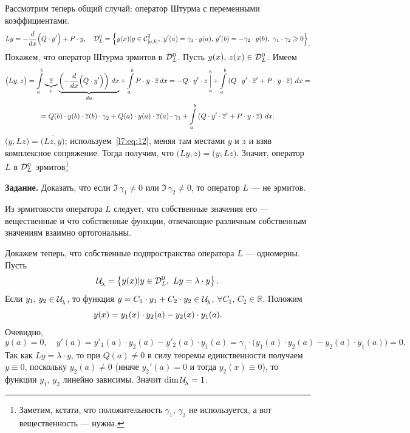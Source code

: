 Рассмотрим теперь общий случай: оператор Штурма с переменными коэффициентами.
\begin{equation*}
	Ly=-\der{}{x}\Big(Q\cdot y'\Big)+P\cdot y,\quad\mc{D}_{L}^{0}=\left\{y(x)|y\in\Cfn[{[a,b]}]{2},\ y'(a)=\gamma_1\cdot y(a),\,y'(b)=-\gamma_2\cdot y(b),\ \gamma_1\cdot\gamma_2\geqslant0\right\}_{\displaystyle.}
\end{equation*}
Покажем, что оператор Штурма эрмитов в $\mathcal{D}_{L}^{0}$. Пусть $y(x),\,z(x)\in\mathcal{D}_{L}^{0}$. Имеем 
\begin{multline}
	\label{l7:eq:12}
	\big(Ly,z\big)=\int\limits_a^b\underbrace{\overline{z}}_{v}\underbrace{\left(-\frac{d}{dx}\Big(Q\cdot y'\Big)\right)\,dx}_{du}+\int\limits_a^b P\cdot y\cdot\overline{z}\,dx=-Q\cdot y'\cdot z\mathop{\Big|}\limits_a^b+\int\limits_a^b\left(Q\cdot y'\cdot\overline{z}'+P\cdot y\cdot\overline{z}\right)\,dx=\\
	=Q(b)\cdot y(b)\cdot\overline{z}(b)\cdot\gamma_2+Q(a)\cdot y(a)\cdot\overline{z}(a)\cdot\gamma_1+\int\limits_a^b\left(Q\cdot y'\cdot\overline{z}'+P\cdot y\cdot\overline{z}\right)\,dx.
\end{multline}
$\big(y,Lz\big)=\overline{\big(Lz,y\big)}$; используем~\eqref{l7:eq:12}, меняя там местами $y$ и $z$ и взяв комплексное сопряжение. Тогда получим, что $\big(Ly,z\big)=\big(y,Lz\big)$. Значит, оператор $L$ в $\mathcal{D}_{L}^{0}$ эрмитов\footnote{Заметим, кстати, что положительность $\gamma_1$, $\gamma_2$ не используется, а вот вещественность --- нужна.}
\vspace{0.2cm}

\noindent\textbf{Задание.} Доказать, что если $\Im\,\gamma_1\neq0$ или $\Im\,\gamma_2\neq0$, то оператор $L$ --- не эрмитов.
\vspace{0.2cm}

Из эрмитовости оператора $L$ следует, что собственные значения его --- вещественные и что собственные функции, отвечающие различным собственным значениям взаимно ортогональны.

Докажем теперь, что собственные подпространства оператора $L$ --- одномерны. Пусть
\begin{equation*}
	\hfill\Ul=\left\{y(x)|y\in\mc{D}_L^0,\ Ly=\lambda\cdot y\right\}.\hfill
\end{equation*}    
Если $y_1,\,y_2\in\mathcal{U}\!{\mathstrut}_{\lambda}$, то функция $y=C_1\cdot y_1+C_2\cdot y_2\in\mathcal{U}\!{\mathstrut}_{\lambda}$, $\forall C_1,\,C_2\in\mathbb{R}$. Положим
\begin{equation*}
	\hfill y(x)=y_1(x)\cdot y_2(a)-y_2(x)\cdot y_1(a).\hfill
\end{equation*}
Очевидно,
\begin{equation*}
	y(a)=0,\quad y'(a)=y'_1(a)\cdot y_2(a)-y'_2(a)\cdot y_1(a)=\gamma_1\cdot\big(y_1(a)\cdot y_2(a)-y_2(a)\cdot y_1(a)\big)=0.
\end{equation*} 
Так как $Ly=\lambda\cdot y$, то при $Q(a)\neq0$ в силу теоремы единственности получаем $y\equiv0$, поскольку $y_2(a)\neq0$ (иначе $y_2'(a)=0$ и тогда $y_2(x)\equiv0$), то функции $y_1,\,y_2$ линейно зависимы. Значит $\dim\mathcal{U}\!{\mathstrut}_{\lambda}=1$.

